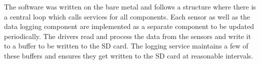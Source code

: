 The software was written on the bare metal and follows a structure where there
is a central loop which calls services for all components.  Each sensor as well
as the data logging component are implemented as a separate component
to be updated periodically. The drivers read and process the data from the
sensors and write it to a buffer to be written to the SD card. The logging service
maintains a few of these buffers and ensures they get written to the SD card
at reasonable intervals.